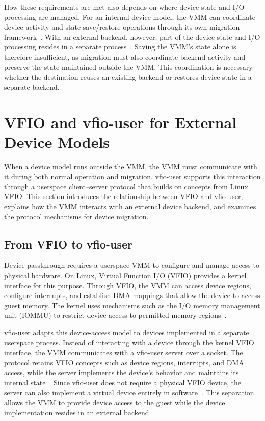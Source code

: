 How these requirements are met also depends on where device state and I/O 
processing are managed. For an internal device model, the VMM can coordinate 
device activity and state save/restore operations through its own migration 
framework~\cite{qemu-migration-framework}. With an external backend, however, 
part of the device state and I/O processing resides in a separate 
process~\cite{qemu-multiprocess,qemu-vhost-user}. Saving the VMM's state alone 
is therefore insufficient, as migration must also coordinate backend activity 
and preserve the state maintained outside the VMM. This coordination is necessary 
whether the destination reuses an existing backend or restores device state in a 
separate backend.

\section{VFIO and vfio-user for External Device Models}
\label{sec:state:vfio-user}

When a device model runs outside the VMM, the VMM must communicate with it 
during both normal operation and migration. vfio-user supports this interaction 
through a userspace client--server protocol that builds on concepts from Linux 
VFIO. This section introduces the relationship between VFIO and vfio-user, 
explains how the VMM interacts with an external device backend, and examines 
the protocol mechanisms for device migration.

\subsection{From VFIO to vfio-user}
\label{sec:state:vfio-interface}

Device passthrough requires a userspace VMM to configure and manage access 
to physical hardware. On Linux, Virtual Function I/O (VFIO) provides a kernel 
interface for this purpose. Through VFIO, the VMM can access device regions, 
configure interrupts, and establish DMA mappings that allow the device to 
access guest memory. The kernel uses mechanisms such as the I/O memory 
management unit (IOMMU) to restrict device access to permitted memory 
regions~\cite{linux-vfio}.

vfio-user adapts this device-access model to devices implemented in a 
separate userspace process. Instead of interacting with a device through 
the kernel VFIO interface, the VMM communicates with a vfio-user server over 
a socket. The protocol retains VFIO concepts such as device regions, interrupts, 
and DMA access, while the server implements the device's behavior and maintains 
its internal state~\cite{johnson2021vfio}. Since vfio-user does not require a 
physical VFIO device, the server can also implement a virtual device entirely 
in software~\cite{libvfio-user-overview}. This separation allows the VMM to 
provide device access to the guest while the device implementation resides in 
an external backend.

